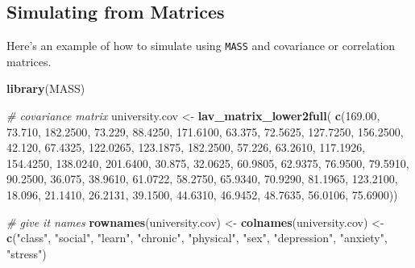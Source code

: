 \documentclass[
  man]{apa7}
\newenvironment{Shaded}{\begin{snugshade}}{\end{snugshade}}
\newcommand{\CommentTok}[1]{\textcolor[rgb]{0.56,0.35,0.01}{\textit{#1}}}
\newcommand{\FloatTok}[1]{\textcolor[rgb]{0.00,0.00,0.81}{#1}}
\newcommand{\FunctionTok}[1]{\textcolor[rgb]{0.13,0.29,0.53}{\textbf{#1}}}
\newcommand{\NormalTok}[1]{#1}
\newcommand{\OtherTok}[1]{\textcolor[rgb]{0.56,0.35,0.01}{#1}}
\newcommand{\StringTok}[1]{\textcolor[rgb]{0.31,0.60,0.02}{#1}}
\begin{document}
\normalsize

\newpage

\subsection{Simulating from Matrices}\label{simulating-from-matrices}

Here's an example of how to simulate using \texttt{MASS} and covariance or correlation matrices.

\small

\begin{Shaded}
\begin{Highlighting}[]
\FunctionTok{library}\NormalTok{(MASS)}

\CommentTok{\# covariance matrix}
\NormalTok{university.cov }\OtherTok{\textless{}{-}} \FunctionTok{lav\_matrix\_lower2full}\NormalTok{(}
    \FunctionTok{c}\NormalTok{(}\FloatTok{169.00}\NormalTok{, }
      \FloatTok{73.710}\NormalTok{, }\FloatTok{182.2500}\NormalTok{,}
      \FloatTok{73.229}\NormalTok{, }\FloatTok{88.4250}\NormalTok{, }\FloatTok{171.6100}\NormalTok{,}
      \FloatTok{63.375}\NormalTok{, }\FloatTok{72.5625}\NormalTok{, }\FloatTok{127.7250}\NormalTok{, }\FloatTok{156.2500}\NormalTok{,}
      \FloatTok{42.120}\NormalTok{, }\FloatTok{67.4325}\NormalTok{, }\FloatTok{122.0265}\NormalTok{, }\FloatTok{123.1875}\NormalTok{, }\FloatTok{182.2500}\NormalTok{,}
      \FloatTok{57.226}\NormalTok{, }\FloatTok{63.2610}\NormalTok{, }\FloatTok{117.1926}\NormalTok{, }\FloatTok{154.4250}\NormalTok{, }\FloatTok{138.0240}\NormalTok{, }\FloatTok{201.6400}\NormalTok{,}
      \FloatTok{30.875}\NormalTok{, }\FloatTok{32.0625}\NormalTok{, }\FloatTok{60.9805}\NormalTok{, }\FloatTok{62.9375}\NormalTok{, }\FloatTok{76.9500}\NormalTok{, }\FloatTok{79.5910}\NormalTok{, }\FloatTok{90.2500}\NormalTok{,}
      \FloatTok{36.075}\NormalTok{, }\FloatTok{38.9610}\NormalTok{, }\FloatTok{61.0722}\NormalTok{, }\FloatTok{58.2750}\NormalTok{, }\FloatTok{65.9340}\NormalTok{, }\FloatTok{70.9290}\NormalTok{, }\FloatTok{81.1965}\NormalTok{, }\FloatTok{123.2100}\NormalTok{,}
      \FloatTok{18.096}\NormalTok{, }\FloatTok{21.1410}\NormalTok{, }\FloatTok{26.2131}\NormalTok{, }\FloatTok{39.1500}\NormalTok{, }\FloatTok{44.6310}\NormalTok{, }\FloatTok{46.9452}\NormalTok{, }\FloatTok{48.7635}\NormalTok{, }\FloatTok{56.0106}\NormalTok{, }\FloatTok{75.6900}\NormalTok{))}

\CommentTok{\# give it names}
\FunctionTok{rownames}\NormalTok{(university.cov) }\OtherTok{\textless{}{-}}
    \FunctionTok{colnames}\NormalTok{(university.cov) }\OtherTok{\textless{}{-}}
    \FunctionTok{c}\NormalTok{(}\StringTok{"class"}\NormalTok{, }\StringTok{"social"}\NormalTok{, }\StringTok{"learn"}\NormalTok{, }\StringTok{"chronic"}\NormalTok{, }\StringTok{"physical"}\NormalTok{, }\StringTok{"sex"}\NormalTok{, }
      \StringTok{"depression"}\NormalTok{, }\StringTok{"anxiety"}\NormalTok{, }\StringTok{"stress"}\NormalTok{)}


\end{Highlighting}
\end{Shaded}
\end{document}
